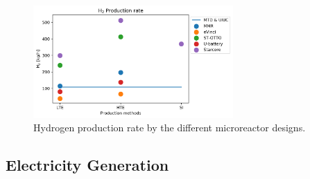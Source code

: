 \documentclass[11pt,letterpaper]{article}
\begin{document}
	\begin{figure}[htbp!]
	    \centering
		\includegraphics[height=4.3cm]{figures/reactors-by-hour1}
		\hfill
		\caption{Hydrogen production rate by the different microreactor designs.}
		\label{fig:hydro-micro}
	\end{figure}

\subsection{Electricity Generation}
\end{document}
